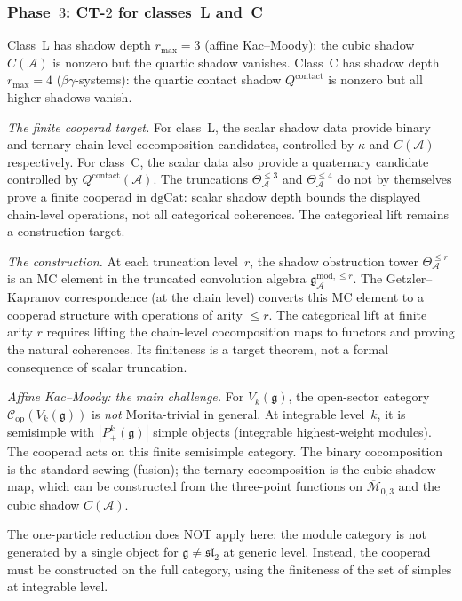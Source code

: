 \documentclass[11pt]{article}
\newcommand{\cA}{\mathcal{A}}
\newcommand{\cC}{\mathcal{C}}
\newcommand{\cM}{\mathcal{M}}
\newcommand{\fg}{\mathfrak{g}}
\begin{document}
\subsubsection*{Phase~$3$: CT-$2$ for classes~L and~C}
\label{par:ct2-phase3}

Class~L has shadow depth $r_{\max} = 3$ (affine Kac--Moody):
the cubic shadow $C(\cA)$ is nonzero but the quartic shadow
vanishes.  Class~C has shadow depth $r_{\max} = 4$
($\beta\gamma$-systems): the quartic contact shadow
$Q^{\mathrm{contact}}$ is nonzero but all higher shadows
vanish.

\noindent\emph{The finite cooperad target.}
For class~L, the scalar shadow data provide binary and ternary
chain-level cocomposition candidates, controlled by $\kappa$ and
$C(\cA)$ respectively.  For class~C, the scalar data also provide
a quaternary candidate controlled by
$Q^{\mathrm{contact}}(\cA)$.  The truncations
$\Theta_\cA^{\leq 3}$ and $\Theta_\cA^{\leq 4}$ do not by
themselves prove a finite cooperad in $\mathrm{dgCat}$: scalar
shadow depth bounds the displayed chain-level operations, not all
categorical coherences.  The categorical lift remains a
construction target.

\noindent\emph{The construction.}
At each truncation level~$r$, the shadow obstruction tower
$\Theta_\cA^{\leq r}$ is an MC element in the truncated
convolution algebra $\mathfrak{g}^{\mathrm{mod},\leq r}_\cA$.  The Getzler--Kapranov
correspondence (at the chain level) converts this MC element
to a cooperad structure with operations of arity $\leq r$.
The categorical lift at finite arity $r$ requires lifting the
chain-level cocomposition maps to functors and proving the
natural coherences.  Its finiteness is a target theorem, not a
formal consequence of scalar truncation.

\noindent\emph{Affine Kac--Moody: the main challenge.}
For $V_k(\fg)$, the open-sector category
$\cC_{\mathrm{op}}(V_k(\fg))$ is \emph{not} Morita-trivial
in general.  At integrable level~$k$, it is semisimple with
$|P_+^k(\fg)|$ simple objects (integrable highest-weight modules).
The cooperad acts on this finite semisimple category.
The binary cocomposition is the standard sewing (fusion);
the ternary cocomposition is the cubic shadow map, which can
be constructed from the three-point functions on
$\overline{\cM}_{0,3}$ and the cubic shadow $C(\cA)$.

The one-particle reduction does NOT apply here: the module
category is not generated by a single object for
$\fg \neq \mathfrak{sl}_2$ at generic level.  Instead, the
cooperad must be constructed on the full category, using the
finiteness of the set of simples at integrable level.
\end{document}
